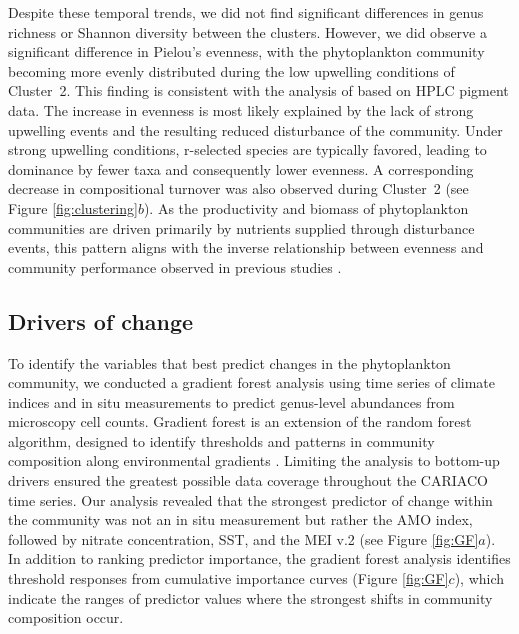 \documentclass[]{agujournal2019}
\begin{document}
    Despite these temporal trends, we did not find significant differences in genus richness or Shannon diversity between the clusters. However, we did observe a significant difference in Pielou's evenness, with the phytoplankton community becoming more evenly distributed during the low upwelling conditions of Cluster~2. This finding is consistent with the analysis of  based on HPLC pigment data. The increase in evenness is most likely explained by the lack of strong upwelling events and the resulting reduced disturbance of the community.  Under strong upwelling conditions, r-selected species are typically favored, leading to dominance by fewer taxa and consequently lower evenness. A corresponding decrease in compositional turnover was also observed during Cluster~2 (see Figure \ref{fig:clustering}$b$). As the productivity and biomass of phytoplankton communities are driven primarily by nutrients supplied through disturbance events, this pattern aligns with the inverse relationship between evenness and community performance observed in previous studies \cite{lehtinen_phytoplankton_2017, otero_phytoplankton_2020}.

    
    
\subsection{Drivers of change}
    To identify the variables that best predict changes in the phytoplankton community, we conducted a gradient forest analysis using time series of climate indices and in situ measurements to predict genus-level abundances from microscopy cell counts. Gradient forest is an extension of the random forest algorithm, designed to identify thresholds and patterns in community composition along environmental gradients \cite{ellis_gradient_2012}. Limiting the analysis to bottom-up drivers ensured the greatest possible data coverage throughout the CARIACO time series. Our analysis revealed that the strongest predictor of change within the community was not an in situ measurement but rather the AMO index, followed by nitrate concentration, SST, and the MEI v.2 (see Figure \ref{fig:GF}$a$). In addition to ranking predictor importance, the gradient forest analysis identifies threshold responses from cumulative importance curves (Figure \ref{fig:GF}$c$), which indicate the ranges of predictor values where the strongest shifts in community composition occur.
    
\end{document}
